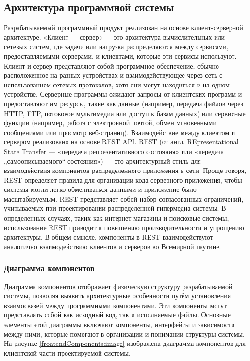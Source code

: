 \subsection{Архитектура программной системы}

Разрабатываемый программный продукт реализован на основе клиент-серверной архитектуре\cite{arch2}. 
«Клиент — сервер» — это архитектура вычислительных или сетевых систем, где задачи или нагрузка распределяются между сервисами, предоставляемыми серверами, и клиентами, которые эти сервисы используют. Клиент и сервер представляют собой программное обеспечение, обычно расположенное на разных устройствах и взаимодействующее через сеть с использованием сетевых протоколов, хотя они могут находиться и на одном устройстве. Серверные программы ожидают запросы от клиентских программ и предоставляют им ресурсы, такие как данные (например, передача файлов через HTTP\cite{http}, FTP, потоковое мультимедиа или доступ к базам данных) или сервисные функции (например, работа с электронной почтой, обмен мгновенными сообщениями или просмотр веб-страниц).
Взаимодействие между клиентом и сервером реализовано на основе REST API\cite{springboot}\cite{webapi}. REST (от англ. REpresentational State Transfer — «передача репрезентативного состояния» или «передача „самоописываемого“ состояния») — это архитектурный стиль для взаимодействия компонентов распределенного приложения в сети. Проще говоря, REST определяет правила для организации кода серверного приложения, чтобы системы могли легко обмениваться данными и приложение было масштабируемым. REST представляет собой набор согласованных ограничений, учитываемых при проектировании распределенной гипермедиа-системы. В определенных случаях, таких как интернет-магазины и поисковые системы, использование REST приводит к повышению производительности и упрощению архитектуры. В общем смысле, компоненты в REST взаимодействуют аналогично взаимодействию клиентов и серверов во Всемирной паутине.

\subsubsection{Диаграмма компонентов}

Диаграмма компонентов отображает физическую структуру разрабатываемой системы, позволяя выявить архитектурные особенности путём установления взаимосвязей между программными компонентами. Эти компоненты могут представлять собой как исходный код, так и исполняемые файлы. Основные элементы этой диаграммы включают компоненты, интерфейсы и зависимости между ними, которые помогают в организации и понимании структуры системы. На рисунке \ref{frontendComponents:image} изображена диаграмма компонентов для клиентской части проектируемой системы\cite{uml}.

